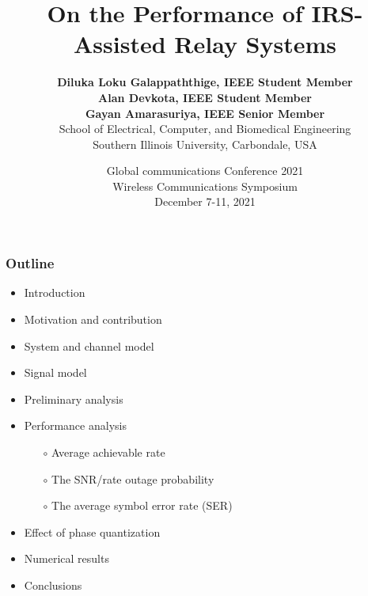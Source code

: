\documentclass[article,mathserif,10pt,envcountsect]{beamer}
\title[ ]{On the Performance of IRS-Assisted Relay Systems}
\author[ ]{{\bf {Diluka Loku Galappaththige, IEEE Student Member\\
			Alan Devkota, IEEE Student Member\\
			 Gayan Amarasuriya, IEEE Senior  Member }} \\[2ex]
	School of Electrical, Computer, and Biomedical Engineering\\
	Southern Illinois University, Carbondale, USA \\[4ex]
}
\date[International Symposium on Turbo Codes \& Iterative Information Processing]{
	\small{
 Global communications Conference 2021\\%
Wireless Communications Symposium\\[2ex]
       December 7-11, 2021}
}
\begin{document}
%

\frame{\titlepage}



\begin{frame}
\frametitle{Outline}

	
\begin{itemize}
	\item Introduction
	\item Motivation and contribution
	\item System and channel model
	\item Signal model
	\item Preliminary analysis
	\item Performance analysis
	\begin{itemize}
		\item[$\circ$] Average achievable rate
		\item[$\circ$] The SNR/rate outage probability
		\item[$\circ$] The average symbol error rate (SER)
	\end{itemize}
	\item Effect of phase quantization
	\item Numerical results
	\item Conclusions
\end{itemize}	


\end{frame}
\end{document}

